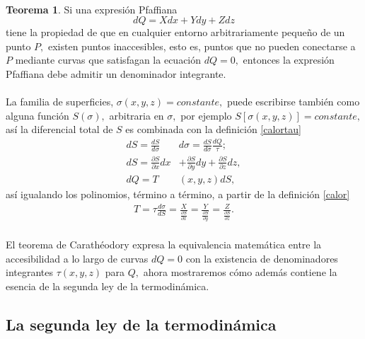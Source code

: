 \documentclass{article}
\theoremstyle{definition} \newtheorem{defi}{Definici\'on}
\theoremstyle{definition} \newtheorem{teo}{Teorema}
\theoremstyle{definition} \newtheorem{cor}{Corolario}
\begin{document}
\paragraph{}
\begin{teo}
Si una expresi\'on Pfaffiana
\begin{equation}\label{calor}
dQ = Xdx + Ydy + Zdz
\end{equation}
tiene la propiedad de que en cualquier entorno arbitrariamente peque\~no de un punto $P,$ existen puntos inaccesibles, esto es, puntos que no pueden conectarse a $P$ mediante curvas que satisfagan la ecuaci\'on $dQ =0,$ entonces la expresi\'on Pfaffiana debe admitir un denominador integrante.
\end{teo}
\paragraph{}
La familia de superficies, $\sigma(x,y,z) = constante,$ puede escribirse tambi\'en como alguna funci\'on $S(\sigma),$ arbitraria en $\sigma,$ por ejemplo $S[\sigma(x,y,z)] = constante,$ as\'i la diferencial total de $S$ es combinada con la definici\'on \eqref{calortau}
\begin{align}
dS = \frac{dS}{d\sigma}&d\sigma = \frac{dS}{d\sigma}\frac{dQ}{\tau};\nonumber\\
dS = \frac{\partial{S}}{\partial{x}}dx &+ \frac{\partial{S}}{\partial{y}}dy + \frac{\partial{S}}{\partial{z}}dz, \nonumber\\
dQ = T&(x,y,z) dS,\label{entropia}
\end{align}
as\'i igualando los polinomios, t\'ermino a t\'ermino, a partir de la definici\'on \eqref{calor}
\begin{align}
T = \tau \frac{d\sigma}{dS} = \frac{X}{\frac{\partial{S}}{\partial{x}}} = \frac{Y}{\frac{\partial{S}}{\partial{y}}} = \frac{Z}{\frac{\partial{S}}{\partial{z}}}.
\end{align}
\paragraph{}
El teorema de Carath\'eodory expresa la equivalencia matem\'atica entre la accesibilidad a lo largo de curvas $dQ = 0$ con la existencia de denominadores integrantes $\tau(x,y,z)$ para $Q,$ ahora mostraremos c\'omo adem\'as contiene la esencia de la segunda ley de la termodin\'amica.

\subsection{La segunda ley de la termodin\'amica}
\end{document}
